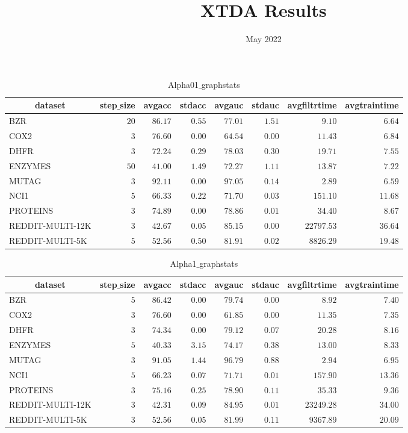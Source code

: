 \documentclass[]{article}
\title{XTDA Results}
\date{May 2022}
\begin{document}
\begin{table}[!tbp]
\caption{Alpha01$\_$graphstats\label{Alpha01_graphstats}} 
{\centering
\begin{tabular}{lrrrrrrr}
\hline\hline
\multicolumn{1}{c}{dataset}&\multicolumn{1}{c}{step$\_$size}&\multicolumn{1}{c}{avgacc}&\multicolumn{1}{c}{stdacc}&\multicolumn{1}{c}{avgauc}&\multicolumn{1}{c}{stdauc}&\multicolumn{1}{c}{avgfiltrtime}&\multicolumn{1}{c}{avgtraintime}\tabularnewline
\hline
BZR&$20$&$86.17$&$0.55$&$77.01$&$1.51$&$    9.10$&$ 6.64$\tabularnewline
COX2&$ 3$&$76.60$&$0.00$&$64.54$&$0.00$&$   11.43$&$ 6.84$\tabularnewline
DHFR&$ 3$&$72.24$&$0.29$&$78.03$&$0.30$&$   19.71$&$ 7.55$\tabularnewline
ENZYMES&$50$&$41.00$&$1.49$&$72.27$&$1.11$&$   13.87$&$ 7.22$\tabularnewline
MUTAG&$ 3$&$92.11$&$0.00$&$97.05$&$0.14$&$    2.89$&$ 6.59$\tabularnewline
NCI1&$ 5$&$66.33$&$0.22$&$71.70$&$0.03$&$  151.10$&$11.68$\tabularnewline
PROTEINS&$ 3$&$74.89$&$0.00$&$78.86$&$0.01$&$   34.40$&$ 8.67$\tabularnewline
REDDIT-MULTI-12K&$ 3$&$42.67$&$0.05$&$85.15$&$0.00$&$22797.53$&$36.64$\tabularnewline
REDDIT-MULTI-5K&$ 5$&$52.56$&$0.50$&$81.91$&$0.02$&$ 8826.29$&$19.48$\tabularnewline
\hline
\end{tabular}}
\end{table}
\begin{table}[!tbp]
\caption{Alpha1$\_$graphstats\label{Alpha1_graphstats}} 
{\centering
\begin{tabular}{lrrrrrrr}
\hline\hline
\multicolumn{1}{c}{dataset}&\multicolumn{1}{c}{step$\_$size}&\multicolumn{1}{c}{avgacc}&\multicolumn{1}{c}{stdacc}&\multicolumn{1}{c}{avgauc}&\multicolumn{1}{c}{stdauc}&\multicolumn{1}{c}{avgfiltrtime}&\multicolumn{1}{c}{avgtraintime}\tabularnewline
\hline
BZR&$5$&$86.42$&$0.00$&$79.74$&$0.00$&$    8.92$&$ 7.40$\tabularnewline
COX2&$3$&$76.60$&$0.00$&$61.85$&$0.00$&$   11.35$&$ 7.35$\tabularnewline
DHFR&$3$&$74.34$&$0.00$&$79.12$&$0.07$&$   20.28$&$ 8.16$\tabularnewline
ENZYMES&$5$&$40.33$&$3.15$&$74.17$&$0.38$&$   13.00$&$ 8.33$\tabularnewline
MUTAG&$3$&$91.05$&$1.44$&$96.79$&$0.88$&$    2.94$&$ 6.95$\tabularnewline
NCI1&$5$&$66.23$&$0.07$&$71.71$&$0.01$&$  157.90$&$13.36$\tabularnewline
PROTEINS&$3$&$75.16$&$0.25$&$78.90$&$0.11$&$   35.33$&$ 9.36$\tabularnewline
REDDIT-MULTI-12K&$3$&$42.31$&$0.09$&$84.95$&$0.01$&$23249.28$&$34.00$\tabularnewline
REDDIT-MULTI-5K&$3$&$52.56$&$0.05$&$81.99$&$0.11$&$ 9367.89$&$20.09$\tabularnewline
\hline
\end{tabular}}
\end{table}
\end{document}
